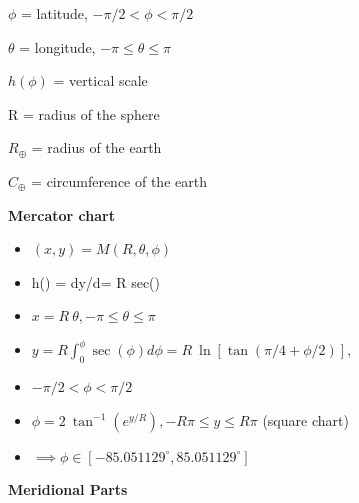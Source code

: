 \documentclass[conference]{IEEEtran}
\begin{document}
\newpage
\vspace{0.5cm}
$\phi$ = latitude, $-\pi/2 < \phi < \pi/2$

$\theta$ = longitude, $-\pi \leq \theta \leq \pi$

$h(\phi)$ = vertical scale

R = radius of the sphere

$R_{\oplus}$ = radius of the earth

$C_{\oplus}$ = circumference of the earth

\vspace{0.5cm}
\textbf{Mercator chart~\cite{Vezie2016}}
\begin{itemize}

\item $(x,y) = M(R,\theta,\phi)$

\item h(\phi) = dy/d\phi = R sec(\phi)

\item $x = R\ \theta , -\pi \leq \theta \leq \pi$

\item $y = R \int_{0}^{\phi } \sec(\phi) d\phi = R\ \ln [\tan (\pi/4 + \phi/2)],$
\item[] $-\pi/2 < \phi < \pi/2$

\item $\phi = 2\ \tan^{-1} (e^{y/R}), -R\pi \leq y \leq R\pi$ (square chart)
\item[] $\implies \phi \in [-85.051129^\circ, 85.051129^\circ]$

\end{itemize}

\vspace{0.5cm}
\textbf{Meridional Parts~\cite{Bowditch2024}}
\end{document}
